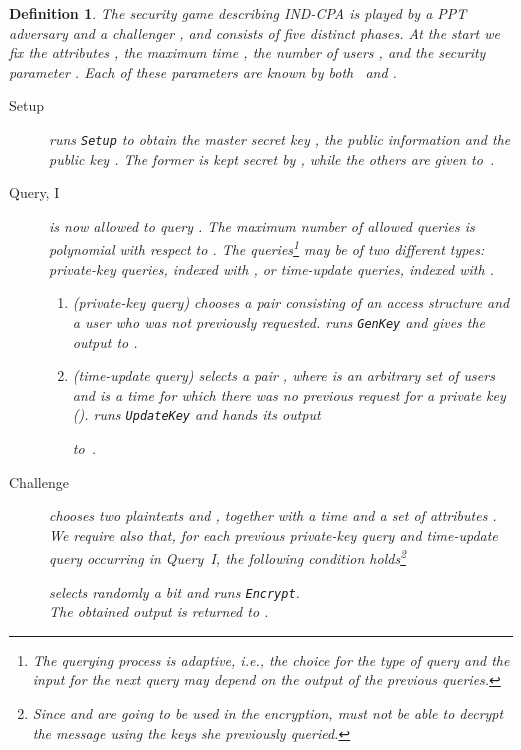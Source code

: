 \documentclass[a4paper,10pt]{article}
\newtheorem{definition}{Definition}
\newcommand{\singlefunction}[1]{\texttt{#1}}
\begin{document}
	\begin{definition} \label{security.def}
		The security game describing IND-CPA is played by a PPT  adversary  and a challenger , and consists of five distinct phases. At the start we fix the attributes , the maximum time , the number of users , and the security parameter . Each of these parameters are known by both~ and .
		\begin{description}
			\item[Setup]
			 runs \singlefunction{Setup} to obtain the master secret key , the public information  and the public key . The former is kept secret by , while the others are given to~.
			
			\item[Query, I]
			 is now allowed to query . The maximum number of allowed queries  is polynomial with respect to .
			The queries\footnote{The querying process is adaptive, i.e., the choice for the type of query and the input for the next query may depend on the output of the previous queries. } may be of two different types: private-key queries,  indexed with , or time-update queries, indexed with . 
			\begin{enumerate}
				\item
				(private-key query)
				 chooses a pair  consisting of an access \linebreak{} structure  and a user  who was not previously requested. 
				 runs \singlefunction{GenKey} and gives the output  to .
				\item
				(time-update query)
				 selects a pair , where  is an arbitrary set of users and  is a time for which there was no previous request for a private key ().
				 runs \singlefunction{UpdateKey} and hands its output 
				 
				to~.
			\end{enumerate}
			
			
			\item[Challenge]
			\label{security.challenge}
			 chooses two plaintexts  and , together with a time  and a set of attributes .
			We require also that, for each previous private-key query  and  time-update query  occurring in Query~I, the following condition holds\footnote{Since  and  are going to be used in the encryption,    must not be able to decrypt the message using the keys she previously queried.}
				
			 selects randomly a bit  and runs \singlefunction{Encrypt}.\\ The obtained output  is returned to .
			

\end{description}
\end{definition}
\end{document}
